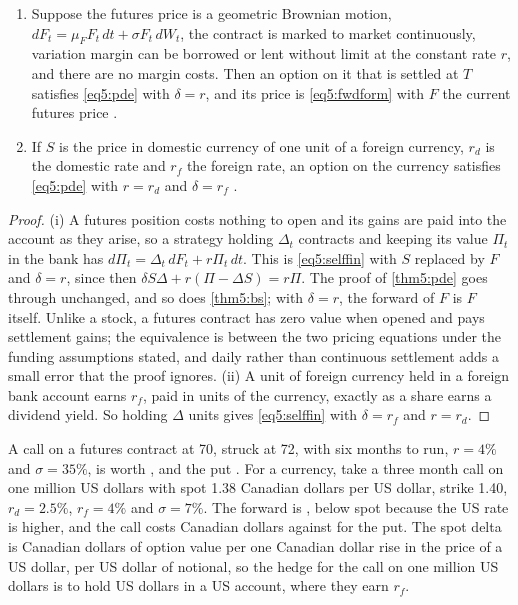 \begin{chapterrefs}
\begin{proposition}\label{prop5:black}
\begin{enumerate}[label=(\roman*)]
  \item Suppose the futures price is a geometric Brownian motion, $dF_t=\mu_FF_t\,dt+\sigma F_t\,dW_t$,
  the contract is marked to market continuously, variation margin can be borrowed or lent without
  limit at the constant rate $r$, and there are no margin costs. Then an option on it that is settled
  at $T$ satisfies \cref{eq5:pde} with $\delta=r$, and its price is \cref{eq5:fwdform} with $F$ the current
  futures price \parencite{black1976}.
  \item If $S$ is the price in domestic currency of one unit of a foreign currency, $r_d$ is the
  domestic rate and $r_f$ the foreign rate, an option on the currency satisfies \cref{eq5:pde} with
  $r=r_d$ and $\delta=r_f$ \parencite{garman1983}.
\end{enumerate}
\end{proposition}

\begin{proof}
(i) A futures position costs nothing to open and its gains are paid into the account as they arise,
so a strategy holding $\Delta_t$ contracts and keeping its value $\Pi_t$ in the bank has
$d\Pi_t=\Delta_t\,dF_t+r\Pi_t\,dt$. This is \cref{eq5:selffin} with $S$ replaced by $F$ and $\delta=r$, since
then $\delta S\Delta+r(\Pi-\Delta S)=r\Pi$. The proof of \cref{thm5:pde} goes through unchanged, and so does
\cref{thm5:bs}; with $\delta=r$, the forward of $F$ is $F$ itself. Unlike a stock, a futures contract has
zero value when opened and pays settlement gains; the equivalence is between the two pricing
equations under the funding assumptions stated, and daily rather than continuous settlement adds a
small error that the proof ignores. (ii) A unit of foreign currency held in a
foreign bank account earns $r_f$, paid in units of the currency, exactly as a share earns a dividend
yield. So holding $\Delta$ units gives \cref{eq5:selffin} with $\delta=r_f$ and $r=r_d$.
\end{proof}

A call on a futures contract at 70, struck at 72, with six months to run, $r=4\%$ and $\sigma=35\%$, is
worth \blackCall, and the put \blackPut. For a currency, take a three month call on one million US
dollars with spot 1.38 Canadian dollars per US dollar, strike 1.40, $r_d=2.5\%$, $r_f=4\%$ and
$\sigma=7\%$. The forward is \gkFwd, below spot because the US rate is higher, and the call costs
\gkCall{} Canadian dollars against \gkPut{} for the put. The spot delta is \gkDelta{} Canadian dollars
of option value per one Canadian dollar rise in the price of a US dollar, per US dollar of notional, so
the hedge for the call on one million US dollars is to hold \gkHedge{} US dollars in a US account,
where they earn $r_f$.


\end{chapterrefs}
